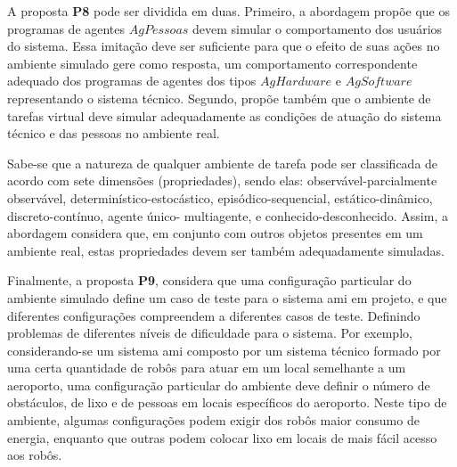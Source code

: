     A proposta \textbf{P8} pode ser dividida em duas. Primeiro, a abordagem propõe que os programas de agentes $AgPessoas$ devem simular o comportamento dos usuários do sistema. Essa imitação deve ser suficiente para que o efeito de suas ações no ambiente simulado gere como resposta, um comportamento correspondente adequado dos programas de agentes dos tipos $AgHardware$ e $AgSoftware$ representando o sistema técnico. Segundo, propõe também que o ambiente de tarefas virtual deve simular adequadamente as condições de atuação do sistema técnico e das pessoas no ambiente real. 
    
    Sabe-se que a natureza de qualquer ambiente de tarefa pode ser classificada de acordo com sete dimensões (propriedades), sendo elas: observável-parcialmente observável, determinístico-estocástico, episódico-sequencial, estático-dinâmico, discreto-contínuo, agente único- multiagente, e conhecido-desconhecido. Assim, a abordagem considera que, em conjunto com outros objetos presentes em um ambiente real, estas propriedades devem ser também adequadamente simuladas. 
    
    Finalmente, a proposta \textbf{P9}, considera que uma configuração particular do ambiente simulado define um caso de teste para o sistema \acrshort{ami} em projeto, e que diferentes configurações compreendem a diferentes casos de teste. Definindo problemas de diferentes níveis de dificuldade para o sistema. Por exemplo, considerando-se um sistema \acrshort{ami} composto por um sistema técnico formado por uma certa quantidade de robôs para atuar em um local semelhante a um aeroporto, uma configuração particular do ambiente deve definir o número de obstáculos, de lixo e de pessoas em locais específicos do aeroporto. Neste tipo de ambiente, algumas configurações podem exigir dos robôs maior consumo de energia, enquanto que outras podem colocar lixo em locais de mais fácil acesso aos robôs.
    
